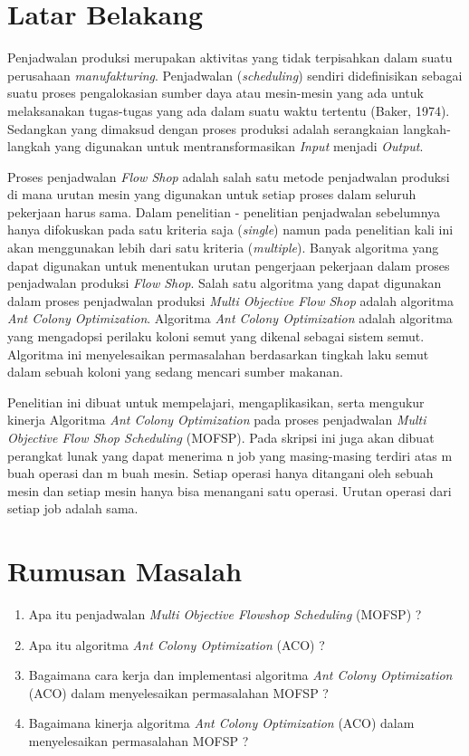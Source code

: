 \documentclass[a4paper,twoside]{article}
\begin{document}
\section{Latar Belakang}

Penjadwalan produksi merupakan aktivitas yang tidak terpisahkan dalam suatu perusahaan {\it manufakturing}. Penjadwalan ({\it scheduling}) sendiri didefinisikan sebagai suatu proses pengalokasian sumber daya atau mesin-mesin yang ada untuk melaksanakan tugas-tugas yang ada dalam suatu waktu tertentu (Baker, 1974). Sedangkan yang dimaksud dengan proses produksi adalah serangkaian langkah-langkah yang digunakan untuk mentransformasikan {\it Input} menjadi {\it Output}.

Proses penjadwalan {\it Flow Shop} adalah salah satu metode penjadwalan produksi di mana urutan mesin yang digunakan untuk setiap proses dalam seluruh pekerjaan harus sama. Dalam penelitian - penelitian penjadwalan sebelumnya hanya difokuskan pada satu kriteria saja ({\it single}) namun pada penelitian kali ini akan menggunakan lebih dari satu kriteria ({\it multiple}). Banyak algoritma yang dapat digunakan untuk menentukan urutan  pengerjaan pekerjaan dalam proses penjadwalan produksi {\it Flow Shop}. Salah satu algoritma yang dapat digunakan dalam proses penjadwalan produksi {\it Multi Objective Flow Shop} adalah algoritma {\it Ant Colony Optimization}. Algoritma {\it Ant Colony Optimization} adalah algoritma yang mengadopsi perilaku koloni semut yang dikenal sebagai sistem semut. Algoritma ini menyelesaikan permasalahan berdasarkan tingkah laku semut dalam sebuah koloni yang sedang mencari sumber makanan.

Penelitian ini dibuat untuk mempelajari, mengaplikasikan, serta mengukur kinerja Algoritma {\it Ant Colony Optimization} pada proses penjadwalan {\it Multi Objective Flow Shop Scheduling} (MOFSP). Pada skripsi ini juga akan dibuat perangkat lunak yang dapat menerima n job yang masing-masing terdiri atas m buah operasi dan m buah mesin. Setiap operasi hanya ditangani oleh sebuah mesin dan setiap mesin hanya bisa menangani satu operasi. Urutan operasi dari setiap job adalah sama.

\section{Rumusan Masalah}

\begin{enumerate}[label=(\alph*)]
	\item Apa itu penjadwalan {\it Multi Objective Flowshop Scheduling} (MOFSP) ?
	\item Apa itu algoritma {\it Ant Colony Optimization} (ACO) ?
	\item Bagaimana cara kerja dan implementasi algoritma {\it Ant Colony Optimization} (ACO) dalam menyelesaikan permasalahan MOFSP ?
	\item Bagaimana kinerja algoritma {\it Ant Colony Optimization} (ACO) dalam menyelesaikan permasalahan MOFSP ?
	
\end{enumerate}
\end{document}
